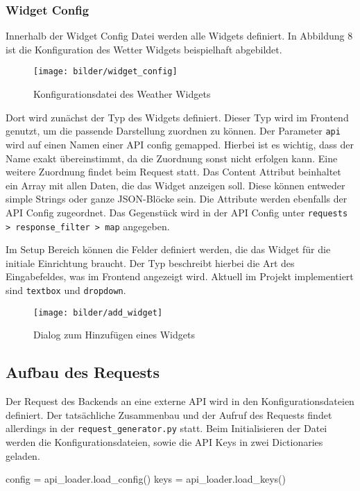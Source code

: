 \subsubsection{Widget Config}

Innerhalb der Widget Config Datei werden alle Widgets definiert. In Abbildung 8 ist die Konfiguration des Wetter Widgets beispielhaft abgebildet.

\begin{figure}[H]
  \centering
    \texttt{[image: bilder/widget\_config]}
    \caption{Konfigurationsdatei des Weather Widgets}
\end{figure}

Dort wird zunächst der Typ des Widgets definiert. Dieser Typ wird im Frontend genutzt, um die passende Darstellung zuordnen zu können. Der Parameter \texttt{api} wird auf einen Namen einer API config  gemapped. Hierbei ist es wichtig, dass der Name exakt übereinstimmt, da die Zuordnung sonst nicht erfolgen kann. Eine weitere Zuordnung findet beim Request statt. Das Content Attribut beinhaltet ein Array mit allen Daten, die das Widget anzeigen soll. Diese können entweder simple Strings oder ganze JSON-Blöcke sein. Die Attribute werden ebenfalls der API Config zugeordnet. Das Gegenstück wird in der API Config unter \texttt{requests > response\_{}filter > map} angegeben.

Im Setup Bereich können die Felder definiert werden, die das Widget für die initiale Einrichtung braucht. Der Typ beschreibt hierbei die Art des Eingabefeldes, was im Frontend angezeigt wird. Aktuell im Projekt implementiert sind \texttt{textbox} und \texttt{dropdown}. 

\begin{figure}[H]
  \centering
    \texttt{[image: bilder/add\_widget]}
    \caption{Dialog zum Hinzufügen eines Widgets}
\end{figure}

\subsection{Aufbau des Requests}
Der Request des Backends an eine externe API wird in den Konfigurationsdateien definiert. Der tatsächliche Zusammenbau und der Aufruf des Requests findet allerdings in der \texttt{request\_{}generator.py} statt. Beim Initialisieren der Datei werden die Konfigurationsdateien, sowie die API Keys in zwei Dictionaries geladen.
 
\begin{python}
config = api_loader.load_config()
keys = api_loader.load_keys()
\end{python}

